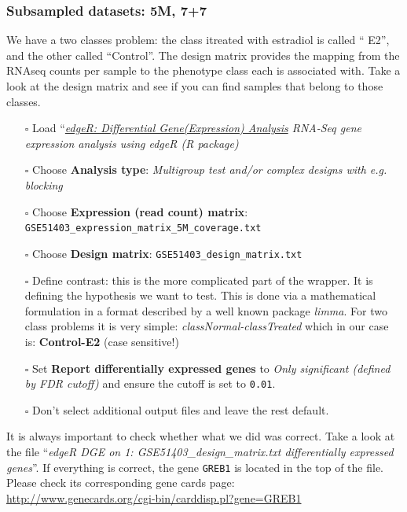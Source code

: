 \documentclass[11pt,a4paper]{article}
\begin{document}
\subsubsection{Subsampled datasets: 5M, 7+7}
We have a two classes problem: the class itreated with estradiol is called “ E2”, and the
other called “Control”. The design matrix provides the mapping from the RNAseq
counts per sample to the phenotype class each is associated with. Take a look at the
design matrix and see if you can find samples that belong to those classes.
\begin{itemize}
	\item [$\square$] Load ``\textit{\underline{edgeR: Differential Gene(Expression) Analysis} RNA-Seq gene expression analysis using edgeR (R package)}
	\item [$\square$] Choose \textbf{Analysis type}: \textit{Multigroup test and/or complex designs with e.g. blocking}
	\item [$\square$] Choose \textbf{Expression (read count) matrix}: {\scriptsize \verb| GSE51403_expression_matrix_5M_coverage.txt|}
	\item [$\square$] Choose \textbf{Design matrix}: \verb|GSE51403_design_matrix.txt|
	\item [$\square$] Define contrast: this is the more complicated part of the wrapper. It is defining the hypothesis we want to test. This is done via a mathematical formulation in a format described by a well known package \textit{limma}. For two class problems it is very simple: \textit{classNormal-classTreated} which in our case is: \textbf{Control-E2} (case sensitive!)
	\item [$\square$] Set \textbf{Report differentially expressed genes} to \textit{Only significant (defined by FDR cutoff)} and ensure the cutoff is set to \verb|0.01|.
	\item [$\square$] Don't select additional output files and leave the rest default.
\end{itemize}
It is always important to check whether what we did was correct. Take a look at the file ``\textit{edgeR DGE on 1: GSE51403\_design\_matrix.txt differentially expressed genes}''. If everything is correct, the gene \verb|GREB1| is located in the top of the file. Please check its corresponding gene cards page:\\
\url{http://www.genecards.org/cgi-bin/carddisp.pl?gene=GREB1}\\
\end{document}
